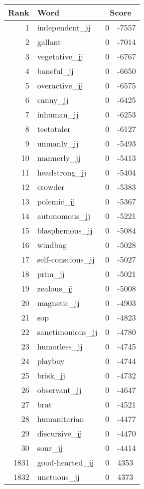 \begin{longtable}[!htbp]{| rlr@{.}l |}
    \hline
    \textbf{Rank} & \textbf{Word} & \multicolumn{2}{c|}{\textbf{Score}} \\
    \hline
    \endhead
    1 & independent\_jj & 0 & -7557 \\
    2 & gallant & 0 & -7014 \\
    3 & vegetative\_jj & 0 & -6767 \\
    4 & baneful\_jj & 0 & -6650 \\
    5 & overactive\_jj & 0 & -6575 \\
    6 & canny\_jj & 0 & -6425 \\
    7 & inhuman\_jj & 0 & -6253 \\
    8 & teetotaler & 0 & -6127 \\
    9 & unmanly\_jj & 0 & -5493 \\
    10 & mannerly\_jj & 0 & -5413 \\
    11 & headstrong\_jj & 0 & -5404 \\
    12 & crowder & 0 & -5383 \\
    13 & polemic\_jj & 0 & -5367 \\
    14 & autonomous\_jj & 0 & -5221 \\
    15 & blasphemous\_jj & 0 & -5084 \\
    16 & windbag & 0 & -5028 \\
    17 & self-conscious\_jj & 0 & -5027 \\
    18 & prim\_jj & 0 & -5021 \\
    19 & zealous\_jj & 0 & -5008 \\
    20 & magnetic\_jj & 0 & -4903 \\
    21 & sop & 0 & -4823 \\
    22 & sanctimonious\_jj & 0 & -4780 \\
    23 & humorless\_jj & 0 & -4745 \\
    24 & playboy & 0 & -4744 \\
    25 & brisk\_jj & 0 & -4732 \\
    26 & observant\_jj & 0 & -4647 \\
    27 & brat & 0 & -4521 \\
    28 & humanitarian & 0 & -4477 \\
    29 & discursive\_jj & 0 & -4470 \\
    30 & sour\_jj & 0 & -4414 \\
    1831 & good-hearted\_jj & 0 & 4353 \\
    1832 & unctuous\_jj & 0 & 4373 \\

\end{longtable}
